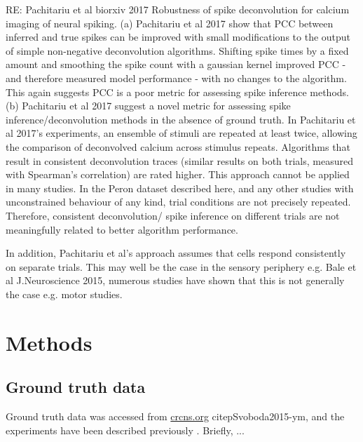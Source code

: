 \documentclass[a4paper,10pt,twocolumn]{article}
\begin{document}
RE: Pachitariu et al biorxiv 2017 Robustness of spike deconvolution for calcium imaging of neural spiking.
(a) Pachitariu et al 2017 show that PCC between inferred and true spikes can be improved with small modifications to the output of simple non-negative deconvolution algorithms. Shifting spike times by a fixed amount and smoothing the spike count with a gaussian kernel improved PCC - and therefore measured model performance - with no changes to the algorithm. This again suggests PCC is a poor metric for assessing spike inference methods.
(b) Pachitariu et al 2017 suggest a novel metric for assessing spike inference/deconvolution methods in the absence of ground truth. In Pachitariu et al 2017's experiments, an ensemble of stimuli are repeated at least twice, allowing the comparison of deconvolved calcium across stimulus repeats. Algorithms that result in consistent deconvolution traces (similar results on both trials, measured with Spearman's correlation) are rated higher. This approach cannot be applied in many studies. In the Peron dataset described here, and any other studies with unconstrained behaviour of any kind, trial conditions are not precisely repeated. Therefore, consistent deconvolution/ spike inference on different trials are not meaningfully related to better algorithm performance. 

In addition, Pachitariu et al's approach assumes that cells respond consistently on separate trials. This may well be the case in the sensory periphery e.g. Bale et al J.Neuroscience 2015, numerous studies have shown that this is not generally the case e.g. motor studies.


\clearpage
\section{Methods}
\subsection*{Ground truth data}
Ground truth data was accessed from \href{http://crcns.org/data-sets/methods/cai-1}{crcns.org} citep{Svoboda2015-ym}, and the experiments have been described previously \cite{Chen2013-nv}. Briefly, ...
\end{document}

